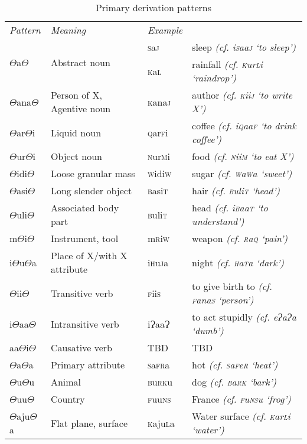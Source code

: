 \documentclass[a4paper,10pt,twoside,openright]{memoir}
\newcommand{\rootpart}{$\Theta$}
\newcommand{\bigglot}{Ɂ}
\newcommand{\famword}[5]{#1\textsc{#2}#3\textsc{#4}#5}
\begin{document}
\begin{table}[ht]
    \centering
    \begin{tabular}{llll}
    \textit{Pattern} & \textit{Meaning} & \textit{Example} & \\
    \multirow{2}{*}{{\rootpart}a{\rootpart}} & \multirow{2}{*}{Abstract noun}& \famword{}{s}{a}{j}{} & sleep \emph{(cf. \famword{i}{s}{aa}{j}{} `to sleep')}\\
    & & \famword{}{k}{a}{l}{} & rainfall \emph{(cf. \famword{}{k}{ur}{l}{i} `raindrop')}\\
    {\rootpart}ana{\rootpart} & Person of X, Agentive noun & \famword{}{k}{ana}{j}{} & author \emph{(cf. \textsc{k}ii\textsc{j} `to write X')}\\
    {\rootpart}ar{\rootpart}i & Liquid noun & \famword{}{q}{ar}{f}{i} & coffee \emph{(cf. i\textsc{q}aa\textsc{f} `to drink coffee')} \\
    {\rootpart}ur{\rootpart}i & Object noun & \famword{}{n}{ur}{m}{i} & food \emph{(cf. \textsc{n}ii\textsc{m} `to eat X')}\\
    {\rootpart}idi{\rootpart} & Loose granular mass & \famword{}{w}{idi}{w}{} & sugar \emph{(cf. \textsc{w}a\textsc{w}a `sweet')} \\
    {\rootpart}asi{\rootpart} & Long slender object & \famword{}{b}{asi}{t}{} & hair \emph{(cf. \textsc{b}uli\textsc{t} `head')} \\
    {\rootpart}uli{\rootpart} & Associated body part & \famword{}{b}{uli}{t}{} & head \emph{(cf. i\textsc{b}aa\textsc{t} `to understand')}\\
    m{\rootpart}i{\rootpart} & Instrument, tool & \famword{m}{r}{i}{w}{} & weapon \emph{(cf. \textsc{r}a\textsc{q} `pain')} \\
    i{\rootpart}u{\rootpart}a & Place of X/with X attribute & \famword{i}{h}{u}{j}{a} & night \emph{(cf. \textsc{h}a\textsc{t}a `dark')} \\
    {\rootpart}ii{\rootpart} & Transitive verb & \famword{}{f}{ii}{s}{} & to give birth to \emph{(cf. \textsc{f}ana\textsc{s} `person')} \\
    i{\rootpart}aa{\rootpart} & Intransitive verb & \famword{i}{\bigglot}{aa}{\bigglot}{} & to act stupidly \emph{(cf. e\bigglot a\bigglot a `dumb')} \\
    aa{\rootpart}i{\rootpart} & Causative verb & TBD & TBD \\
    {\rootpart}a{\rootpart}a & Primary attribute & \famword{}{s}{a}{fr}{a} & hot \emph{(cf. \textsc{s}a\textsc{f}e\textsc{r} `heat')} \\
    {\rootpart}u{\rootpart}u & Animal & \famword{}{b}{u}{rk}{u} & dog \emph{(cf. \textsc{b}a\textsc{rk} `bark')} \\
    {\rootpart}uu{\rootpart} & Country & \famword{}{f}{uu}{ns}{} & France \emph{(cf. \textsc{f}u\textsc{ns}u `frog')} \\
    {\rootpart}aju{\rootpart}a & Flat plane, surface & \famword{}{k}{aju}{l}{a} & Water surface \emph{(cf. \textsc{k}ar\textsc{l}i `water')}
    \end{tabular}
    \caption{Primary derivation patterns}
    \label{tab:primedevs}
\end{table}
\end{document}
